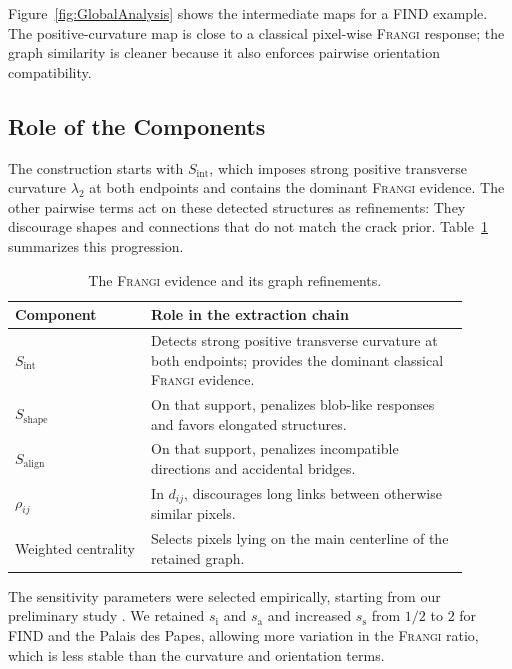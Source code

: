 \documentclass[conference,a4paper]{IEEEtran}
\newcommand{\Frangi}{\textnormal{\textsc{Frangi}}}
\begin{document}
Figure~\ref{fig:GlobalAnalysis} shows the intermediate maps for a FIND example. The positive-curvature map is close to a classical pixel-wise \Frangi{} response; the graph similarity is cleaner because it also enforces pairwise orientation compatibility.

\subsection{Role of the Components}
\label{sec:role_components}
The construction starts with $S_{\mathrm{int}}$, which imposes strong positive transverse curvature $\lambda_2$ at both endpoints and contains the dominant \Frangi{} evidence. The other pairwise terms act on these detected structures as refinements: They discourage shapes and connections that do not match the crack prior. Table~\ref{tab:components} summarizes this progression.

\begin{table}[!ht]
    \centering
    \caption{The \Frangi{} evidence and its graph refinements.}
    \label{tab:components}
    \begin{tabular}{p{0.27\linewidth}p{0.63\linewidth}}
        \toprule
        \textbf{Component} & \textbf{Role in the extraction chain} \\
        \midrule
        $S_{\mathrm{int}}$ & Detects strong positive transverse curvature at both endpoints; provides the dominant classical \Frangi{} evidence. \\
        $S_{\mathrm{shape}}$ & On that support, penalizes blob-like responses and favors elongated structures. \\
        $S_{\mathrm{align}}$ & On that support, penalizes incompatible directions and accidental bridges. \\
        $\rho_{ij}$ & In $d_{ij}$, discourages long links between otherwise similar pixels. \\
        Weighted centrality & Selects pixels lying on the main centerline of the retained graph. \\
        \bottomrule
    \end{tabular}
\end{table}

The sensitivity parameters were selected empirically, starting from our preliminary study \cite{BibiStrasbourg}. We retained $s_{\mathrm{i}}$ and $s_{\mathrm{a}}$ and increased $s_{\mathrm{s}}$ from $1/2$ to $2$ for FIND and the Palais des Papes, allowing more variation in the \Frangi{} ratio, which is less stable than the curvature and orientation terms.
\end{document}
